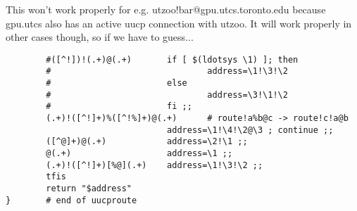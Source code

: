 This won't work properly for e.g. utzoo!bar@gpu.utcs.toronto.edu
because gpu.utcs also has an active uucp connection with utzoo.
It will work properly in other cases though, so if we have to guess...

\begin{tscreen}
\begin{verbatim}
        #([^!])!(.+)@(.+)       if [ $(ldotsys \1) ]; then
        #                               address=\1!\3!\2
        #                       else
        #                               address=\3!\1!\2
        #                       fi ;;
        (.+)!([^!]+)%([^!%]+)@(.+)      # route!a%b@c -> route!c!a@b
                                address=\1!\4!\2@\3 ; continue ;;
        ([^@]+)@(.+)            address=\2!\1 ;;
        @(.+)                   address=\1 ;;
        (.+)!([^!]+)[%@](.+)    address=\1!\3!\2 ;;
        tfis
        return "$address"
}       # end of uucproute
\end{verbatim}
 
\end{tscreen}
